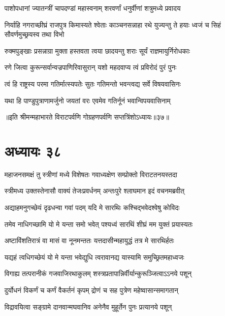 \twolineshloka
{पाशोपधानां ज्यातन्त्रीं चापदण्डां महास्वनाम्}
{शरवर्णां धनुर्वीणां शत्रुमध्ये प्रवादय}


\threelineshloka
{निर्याहि नगराच्छीघ्रं राजपुत्र किमास्यते}
{श्वेताः काञ्चनसन्नाहा रथे युज्यन्तु ते हयाः}
{ध्वजं च सिहं सौवर्णमुच्छ्रयस्व तथा विभो}


\twolineshloka
{रुक्मपुङ्खाः प्रसन्नाग्रा मुक्ता हस्तवता त्वया}
{छादयन्तु शराः सूर्यं राज्ञमायुर्निरोधकाः}


\twolineshloka
{रणे जित्वा कुरून्सर्वान्वज्रपाणिरिवासुरान्}
{यशो महदवाप्य त्वं प्रविरोदं पुरं पुनः}


\twolineshloka
{त्वं हि राष्ट्रस्य परमा गतिर्मात्स्यपतेः सुतः}
{गतिमन्तो भवन्त्वद्य सर्वे विषयवासिनः}


\twolineshloka
{यथा हि पाण्डुपुत्राणामर्जुनो जयतां वरः}
{एवमेव गतिर्नूनं भवान्विपयवासिनाम्}

॥इति श्रीमन्महाभारते विराटपर्वणि गोग्रहणपर्वणि सप्तत्रिंशोऽध्यायः॥३७॥

\chapter{अध्यायः ३८}

\twolineshloka
{महाजनसमक्षं तु स्त्रीणां मध्ये विशेषतः}
{गवाध्यक्षेण सम्प्रोक्तो विराटतनयस्तदा}


\twolineshloka
{स्त्रीमध्य उक्तस्तेनासौ वाक्यं तेजःप्रवर्धनम्}
{अन्तःपुरे श्लाघमान इदं वचनमब्रवीत्}




\twolineshloka
{अद्याहमनुगच्छेयं दृढधन्वा गवां पदम्}
{यदि मे सारथिः कश्चिद्भवेदश्वेषु कोविदः}


\twolineshloka
{तमेव नाधिगच्छामि यो मे यन्ता समो भवेत्}
{पश्यध्वं सारथिं शीघ्रं मम युक्तं प्रयास्यतः}


\twolineshloka
{अष्टाविंशतिरात्रं वा मासं वा नूनमन्ततः}
{यत्तदासीन्महायुद्धं तत्र मे सारथिर्हतः}


\twolineshloka
{यद्यहं त्वधिगच्छेयं यो मे यन्ता भवेद्युधि}
{त्वरावानद्य यास्यामि समुच्छ्रितमहाध्वजः}


\twolineshloka
{विगाह्य तत्परानीकं गजवाजिरथाकुलम्}
{शस्त्रप्रतापान्निर्वीर्यान्कुरूञ्जित्वाऽऽनये पशून्}


\twolineshloka
{दुर्योधनं विकर्णं च कर्णं वैकर्तनं कृपम्}
{द्रोणं च सह पुत्रेण महेष्वासान्समागतान्}


\twolineshloka
{विद्रावयित्वा सङ्ग्रामे दानवान्मघवानिव}
{अनेनैव मुहूर्तेन पुनः प्रत्यानये पशून्}


